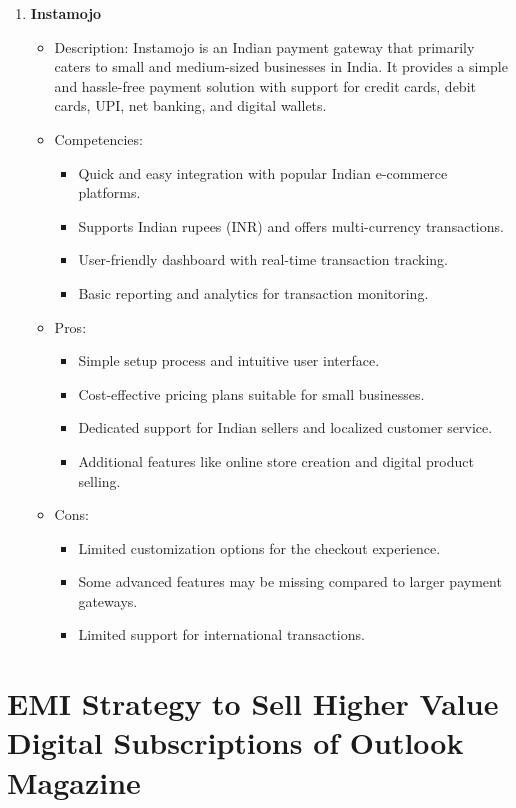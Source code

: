 \begin{enumerate}
\item \textbf{Instamojo}
\begin{itemize}
  \item Description: Instamojo is an Indian payment gateway that primarily caters to small and medium-sized businesses in India. It provides a simple and hassle-free payment solution with support for credit cards, debit cards, UPI, net banking, and digital wallets.
  \item Competencies:
    \begin{itemize}
      \item Quick and easy integration with popular Indian e-commerce platforms.
      \item Supports Indian rupees (INR) and offers multi-currency transactions.
      \item User-friendly dashboard with real-time transaction tracking.
      \item Basic reporting and analytics for transaction monitoring.
    \end{itemize}
  \item Pros:
    \begin{itemize}
      \item Simple setup process and intuitive user interface.
      \item Cost-effective pricing plans suitable for small businesses.
      \item Dedicated support for Indian sellers and localized customer service.
      \item Additional features like online store creation and digital product selling.
    \end{itemize}
  \item Cons:
    \begin{itemize}
      \item Limited customization options for the checkout experience.
      \item Some advanced features may be missing compared to larger payment gateways.
      \item Limited support for international transactions.
    \end{itemize}
\end{itemize}
\end{enumerate}

\section{EMI Strategy to Sell Higher Value Digital Subscriptions of Outlook Magazine}

